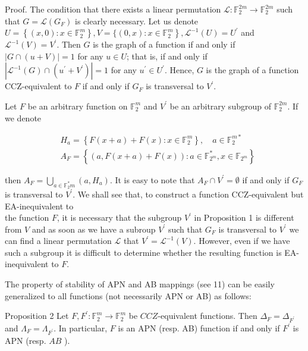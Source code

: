\documentclass[10pt]{article}
\begin{document}
Proof. The condition that there exists a linear permutation $\mathcal{L}: \mathbb{F}_{2}^{2 m} \rightarrow \mathbb{F}_{2}^{2 m}$ such that $G=\mathcal{L}\left(G_{F}\right)$ is clearly necessary. Let us denote $U=\left\{(x, 0): x \in \mathbb{F}_{2}^{m}\right\}, V=\{(0, x): x \in \left.\mathbb{F}_{2}^{m}\right\}, \mathcal{L}^{-1}(U)=U^{\prime}$ and $\mathcal{L}^{-1}(V)=V^{\prime}$. Then $G$ is the graph of a function if and only if $|G \cap(u+V)|=1$ for any $u \in U$; that is, if and only if $\left|\mathcal{L}^{-1}(G) \cap\left(u^{\prime}+V^{\prime}\right)\right|=1$ for any $u^{\prime} \in U^{\prime}$. Hence, $G$ is the graph of a function CCZ-equivalent to $F$ if and only if $G_{F}$ is transversal to $V^{\prime}$.

Let $F$ be an arbitrary function on $\mathbb{F}_{2}^{m}$ and $V^{\prime}$ be an arbitrary subgroup of $\mathbb{F}_{2}^{2 m}$. If we denote

$$
\begin{aligned}
& H_{a}=\left\{F(x+a)+F(x): x \in \mathbb{F}_{2}^{m}\right\}, \quad a \in \mathbb{F}_{2}^{m *} \\
& A_{F}=\left\{(a, F(x+a)+F(x)): a \in \mathbb{F}_{2^{m}}^{*}, x \in \mathbb{F}_{2^{m}}\right\}
\end{aligned}
$$

then $A_{F}=\bigcup_{a \in \mathbb{F}_{2}^{*} m}\left(a, H_{a}\right)$. It is easy to note that $A_{F} \cap V^{\prime}=\emptyset$ if and only if $G_{F}$ is transversal to $V^{\prime}$. We shall see that, to construct a function CCZ-equivalent but EA-inequivalent to\\
the function $F$, it is necessary that the subgroup $V^{\prime}$ in Proposition 1 is different from $V$ and as soon as we have a subroup $V^{\prime}$ such that $G_{F}$ is transversal to $V^{\prime}$ we can find a linear permutation $\mathcal{L}$ that $V^{\prime}=\mathcal{L}^{-1}(V)$. However, even if we have such a subgroup it is difficult to determine whether the resulting function is EA-inequivalent to $F$.

The property of stability of APN and AB mappings (see 11) can be easily generalized to all functions (not necessarily APN or AB) as follows:

Proposition 2 Let $F, F^{\prime}: \mathbb{F}_{2}^{m} \rightarrow \mathbb{F}_{2}^{m}$ be $C C Z$-equivalent functions. Then $\Delta_{F}=\Delta_{F^{\prime}}$ and $\Lambda_{F}=\Lambda_{F^{\prime}}$. In particular, $F$ is an APN (resp. AB) function if and only if $F^{\prime}$ is APN (resp. $A B$ ).
\end{document}
